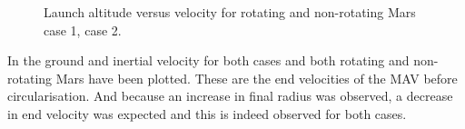 \begin{figure}[H]
\centering
{} 
\caption{Launch altitude versus velocity for rotating and non-rotating Mars \protect{} case 1,  \protect{} case 2. } 
\label{fig:launchAltitudeVsVelocityCase1combined} 
\end{figure} 

\noindent 
In  the ground and inertial velocity for both cases and both rotating and non-rotating Mars have been plotted. These are the end velocities of the \ac{MAV} before circularisation. And because an increase in final radius was observed, a decrease in end velocity was expected and this is indeed observed for both cases. \\

